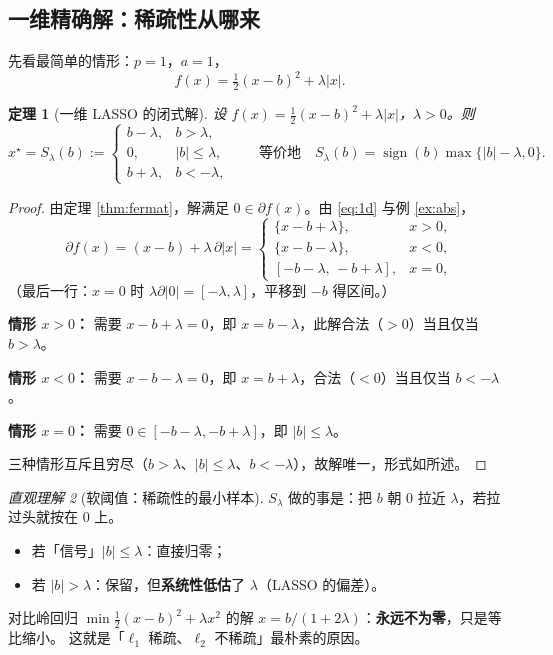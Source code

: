 \documentclass[11pt,a4paper,UTF8]{ctexart}
\theoremstyle{plain}
\newtheorem{theorem}{定理}[section]
\theoremstyle{definition}
\theoremstyle{remark}
\newtheorem{intuition}[theorem]{直观理解}
\newcommand{\abs}[1]{\left\lvert #1 \right\rvert}
\DeclareMathOperator{\sign}{sign}
\begin{document}
\subsection{一维精确解：稀疏性从哪来}

先看最简单的情形：$p=1$，$a=1$，
\begin{equation}
f(x)=\tfrac12(x-b)^2+\lambda\abs{x} .
\label{eq:1d}
\end{equation}

\begin{theorem}[一维 LASSO 的闭式解]\label{thm:1d}
设 $f(x)=\tfrac12(x-b)^2+\lambda\abs{x}$，$\lambda>0$。则
\[
x^\star=S_\lambda(b):=
\begin{cases}
b-\lambda, & b>\lambda,\\
0, & \abs{b}\le\lambda,\\
b+\lambda, & b<-\lambda,
\end{cases}
\qquad\text{等价地}\quad S_\lambda(b)=\sign(b)\max\{\abs{b}-\lambda,0\}.
\]
\end{theorem}

\begin{proof}
由定理 \ref{thm:fermat}，解满足 $0\in\partial f(x)$。由 \eqref{eq:1d} 与例 \ref{ex:abs}，
\[
\partial f(x)=(x-b)+\lambda\,\partial\abs{x}
=\begin{cases}
\{x-b+\lambda\}, & x>0,\\
\{x-b-\lambda\}, & x<0,\\
[-b-\lambda,\,-b+\lambda], & x=0 ,
\end{cases}
\]
（最后一行：$x=0$ 时 $\lambda\partial\abs{0}=[-\lambda,\lambda]$，平移到 $-b$ 得区间。）

\textbf{情形 $x>0$：} 需要 $x-b+\lambda=0$，即 $x=b-\lambda$，此解合法（$>0$）当且仅当 $b>\lambda$。

\textbf{情形 $x<0$：} 需要 $x-b-\lambda=0$，即 $x=b+\lambda$，合法（$<0$）当且仅当 $b<-\lambda$。

\textbf{情形 $x=0$：} 需要 $0\in[-b-\lambda,-b+\lambda]$，即 $\abs{b}\le\lambda$。

三种情形互斥且穷尽（$b>\lambda$、$\abs b\le\lambda$、$b<-\lambda$），故解唯一，形式如所述。
\end{proof}

\begin{intuition}[软阈值：稀疏性的最小样本]
$S_\lambda$ 做的事是：把 $b$ 朝 $0$ 拉近 $\lambda$，若拉过头就按在 $0$ 上。
\begin{itemize}
\item 若「信号」$\abs{b}\le\lambda$：直接归零；
\item 若 $\abs{b}>\lambda$：保留，但\textbf{系统性低估}了 $\lambda$（LASSO 的偏差）。
\end{itemize}
对比岭回归 $\min\tfrac12(x-b)^2+\lambda x^2$ 的解 $x=b/(1+2\lambda)$：\textbf{永远不为零}，只是等比缩小。
这就是「$\ell_1$ 稀疏、$\ell_2$ 不稀疏」最朴素的原因。
\end{intuition}
\end{document}
